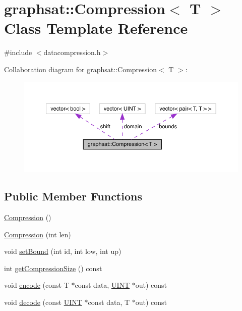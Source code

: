 \hypertarget{classgraphsat_1_1_compression}{}\section{graphsat\+::Compression$<$ T $>$ Class Template Reference}
\label{classgraphsat_1_1_compression}


{\ttfamily \#include $<$datacompression.\+h$>$}



Collaboration diagram for graphsat\+::Compression$<$ T $>$\+:
\nopagebreak
\begin{figure}[H]
\begin{center}
\leavevmode
\includegraphics[width=350pt]{classgraphsat_1_1_compression__coll__graph}
\end{center}
\end{figure}
\subsection*{Public Member Functions}
\begin{DoxyCompactItemize}
\item 
\mbox{\hyperlink{classgraphsat_1_1_compression_a07c8f8c5cfa98228b0a03c2f21d6ac44}{Compression}} ()
\item 
\mbox{\hyperlink{classgraphsat_1_1_compression_a05cf60de010437871e6a649398377380}{Compression}} (int len)
\item 
void \mbox{\hyperlink{classgraphsat_1_1_compression_aca0cf58115662df90a0ba2d7b8fc699b}{set\+Bound}} (int id, int low, int up)
\item 
int \mbox{\hyperlink{classgraphsat_1_1_compression_acac0787ecffc12d1608c8d39e59465f6}{get\+Compression\+Size}} () const
\item 
void \mbox{\hyperlink{classgraphsat_1_1_compression_acf45cee3c5c364552b6815f659687df9}{encode}} (const T $\ast$const data, \mbox{\hyperlink{namespacegraphsat_aa3b3d61a8c27ffc03448c5e1f3a76aed}{U\+I\+NT}} $\ast$out) const
\item 
void \mbox{\hyperlink{classgraphsat_1_1_compression_a76b8dd8b2673ed317f179e145685e861}{decode}} (const \mbox{\hyperlink{namespacegraphsat_aa3b3d61a8c27ffc03448c5e1f3a76aed}{U\+I\+NT}} $\ast$const data, T $\ast$out) const
\end{DoxyCompactItemize}

